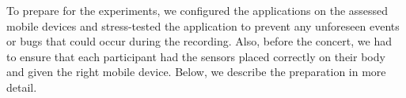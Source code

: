 \begin{table}
\begin{center}
\caption{Device models used during the concert}
\end{center}
\end{table}

To prepare for the experiments, we configured the applications on the assessed mobile devices and stress-tested the application to prevent any unforeseen events or bugs that could occur during the recording. Also, before the concert, we had to ensure that each participant had the sensors placed correctly on their body and given the right mobile device. Below, we describe the preparation in more detail.

